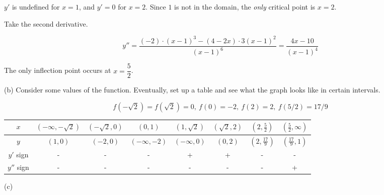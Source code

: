 \documentclass{article}
\begin{document}
\hfill

\noindent $y'$ is undefined for $x=1$, and $y'=0$ for $x=2$. Since $1$ is not in the domain, the \textit{only} critical point is $x = 2$.

\hfill

\noindent Take the second derivative.

\[y''=\frac{(-2)\cdot(x-1)^3-(4-2x)\cdot3(x-1)^2}{(x-1)^6}=\frac{4x-10}{(x-1)^4}\]

\hfill

\noindent The only inflection point occurs at $x=\dfrac52$.

\hfill

\noindent (b) Consider some values of the function. Eventually, set up a table and see what the graph looks like in certain intervals.

\[f\left(-\sqrt2\right)=f\left(\sqrt2\right)=0,\:f(0)=-2,\:f(2)=2,\:f(5/2)=17/9\]

\begin{center}
    \large
    \begin{tabular}{ |c| c c c c c c c| } 
    \hline
        $x$ & $\left(-\infty, -\sqrt2\right)$ & $\left(-\sqrt2, 0\right)$&$\left(0, 1\right)$ & $\left(1,\sqrt2\right)$ & $\left(\sqrt2, 2\right)$ & $\left(2, \frac52\right)$ & $\left(\frac52, \infty\right)$  \\
        \hline
        $y$ & $(1, 0)$ &$(-2,0)$ & $(-\infty, -2)$& $(-\infty, 0)$& $(0, 2)$& $\left(2, \frac{17}9\right)$& $\left(\frac{17}9,1\right)$\\
        \hline
        $y'$ sign &-&-&-&+&+&-&- \\
        \hline
        $y''$ sign &-&-&-&-&-&-&+ \\
        \hline
    \end{tabular}
\end{center}

\newpage

\noindent (c)

\begin{center}
\end{center}
\end{document}
